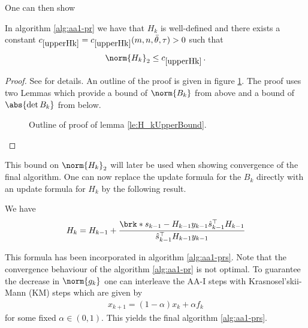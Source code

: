 One can then show
\begin{lemma}\label{le:H_kUpperBound}
	In algorithm \ref{alg:aa1-pr} we have that $H_k$ is well-defined and there exists a constant $\useconstant{upperHk}=\useconstant{upperHk}(m,n, \bartheta,\tau)>0$ such that
	\begin{align*}
		\norm{H_k}_2\leq \useconstant{upperHk}\,.
	\end{align*}
\end{lemma}
\begin{proof}
	See \cite[Corollary 4]{ZhaAA} for details. An outline of the proof is given in figure \ref{fig:Diagram_001}. The proof uses two Lemmas which provide a bound of $\norm{B_k}$ from above and a bound of $\abs{\det B_k}$ from below.
	
	\begin{figure}
	\centering
	\scalebox{0.7}{{\normalsize
	
	}}
	\caption{Outline of proof of lemma \ref{le:H_kUpperBound}.}
	\label{fig:Diagram_001}
	\end{figure}
\end{proof}
This bound on $\norm{H_k}_2$ will later be used when showing convergence of the final algorithm. One can now replace the update formula for the $B_k$ directly with an update formula for $H_k$ by the following result.
\begin{proposition}
	We have
	\begin{align*}
		H_{k} = H_{k-1}+\frac{\brk*{s_{k-1}-H_{k-1}y_{k-1}}\hs_{k-1}^\top H_{k-1}}{\hs_{k-1}^\top H_{k-1}y_{k-1}}
	\end{align*}
\end{proposition}
This formula has been incorporated in algorithm \ref{alg:aa1-prs}.
Note that the convergence behaviour of the algorithm \ref{alg:aa1-pr} is not optimal.
To guarantee the decrease in $\norm{g_k}$ one can interleave the AA-I steps with Krasnosel'skii-Mann (KM) steps which are given by
\begin{align*}
	x_{k+1}= (1-\alpha)x_k +\alpha f_k
\end{align*}
for some fixed $\alpha\in(0,1)$. This yields the final algorithm \ref{alg:aa1-prs}.

